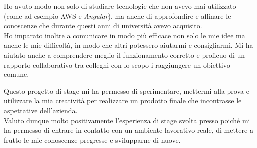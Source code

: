 \noindent Ho avuto modo non solo di studiare tecnologie che non avevo mai utilizzato (come ad esempio \gls{AWS} e \emph{Angular}), ma anche di approfondire e affinare le conoscenze che durante questi anni di università avevo acquisito.\\

\noindent Ho imparato inoltre a comunicare in modo più efficace non solo le mie idee ma anche le mie difficoltà, in modo che altri potessero aiutarmi e consigliarmi. Mi ha aiutato anche a comprendere meglio il funzionamento corretto e proficuo di un rapporto collaborativo tra colleghi con lo scopo i raggiungere un obiettivo comune.

\noindent Questo progetto di stage mi ha permesso di sperimentare, mettermi alla prova e utilizzare la mia creatività per 
realizzare un prodotto finale che incontrasse le aspettative dell'azienda. \\

\noindent Valuto dunque molto positivamente l'esperienza di stage svolta presso \azienda poiché mi ha permesso di entrare in contatto con un ambiente lavorativo reale, di mettere a frutto le mie conoscenze pregresse e svilupparne di nuove.
